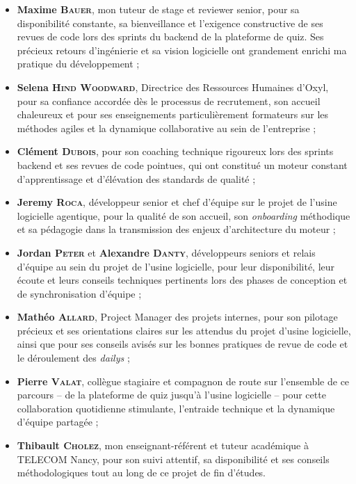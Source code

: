 \documentclass{tnreport}
\begin{document}
\begin{itemize}
    \item \textbf{Maxime \textsc{Bauer}}, mon tuteur de stage et reviewer senior, pour sa disponibilité constante, sa bienveillance et l'exigence constructive de ses revues de code lors des sprints du backend de la plateforme de quiz. Ses précieux retours d'ingénierie et sa vision logicielle ont grandement enrichi ma pratique du développement ;
    \item \textbf{Selena \textsc{Hind Woodward}}, Directrice des Ressources Humaines d'Oxyl, pour sa confiance accordée dès le processus de recrutement, son accueil chaleureux et pour ses enseignements particulièrement formateurs sur les méthodes agiles et la dynamique collaborative au sein de l'entreprise ;
    \item \textbf{Clément \textsc{Dubois}}, pour son coaching technique rigoureux lors des sprints backend et ses revues de code pointues, qui ont constitué un moteur constant d'apprentissage et d'élévation des standards de qualité ;
    \item \textbf{Jeremy \textsc{Roca}}, développeur senior et chef d'équipe sur le projet de l'usine logicielle agentique, pour la qualité de son accueil, son \textit{onboarding} méthodique et sa pédagogie dans la transmission des enjeux d'architecture du moteur ;
    \item \textbf{Jordan \textsc{Peter}} et \textbf{Alexandre \textsc{Danty}}, développeurs seniors et relais d'équipe au sein du projet de l'usine logicielle, pour leur disponibilité, leur écoute et leurs conseils techniques pertinents lors des phases de conception et de synchronisation d'équipe ;
    \item \textbf{Mathéo \textsc{Allard}}, Project Manager des projets internes, pour son pilotage précieux et ses orientations claires sur les attendus du projet d'usine logicielle, ainsi que pour ses conseils avisés sur les bonnes pratiques de revue de code et le déroulement des \textit{dailys} ;
    \item \textbf{Pierre \textsc{Valat}}, collègue stagiaire et compagnon de route sur l'ensemble de ce parcours -- de la plateforme de quiz jusqu'à l'usine logicielle -- pour cette collaboration quotidienne stimulante, l'entraide technique et la dynamique d'équipe partagée ;
    \item \textbf{Thibault \textsc{Cholez}}, mon enseignant-référent et tuteur académique à TELECOM Nancy, pour son suivi attentif, sa disponibilité et ses conseils méthodologiques tout au long de ce projet de fin d'études.
\end{itemize}
\end{document}
